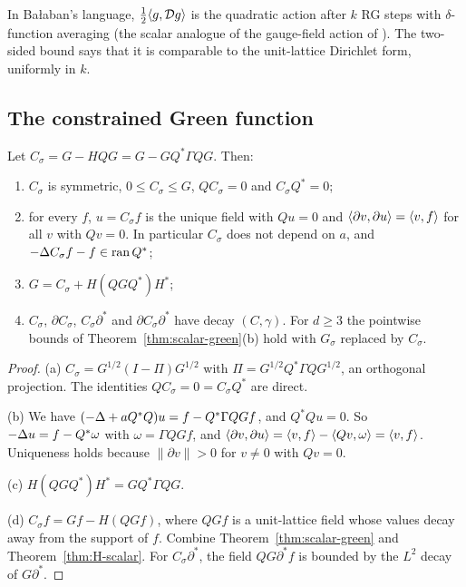 In Ba\l aban's language, $\frac12\langle g,\mathcal D g\rangle$ is the quadratic action after $k$ RG steps with $\delta$-function averaging (the scalar analogue of the gauge-field action of \cite[(1.65)--(1.67)]{BalPropI}). The two-sided bound says that it is comparable to the unit-lattice Dirichlet form, uniformly in $k$.

\subsection{The constrained Green function}

\begin{proposition}\label{prop:C-scalar}
Let $C_\sigma=G-HQG=G-GQ^*\Gamma QG$. Then:
\begin{enumerate}[label=(\alph*)]
\item $C_\sigma$ is symmetric, $0\le C_\sigma\le G$, $QC_\sigma=0$ and $C_\sigma Q^*=0$;
\item for every $f$, $u=C_\sigma f$ is the unique field with $Qu=0$ and $\langle \partial v,\partial u\rangle=\langle v,f\rangle$ for all $v$ with $Qv=0$. In particular $C_\sigma$ does not depend on $a$, and $-\Delta C_\sigma f-f\in\operatorname{ran} Q^*$;
\item $G=C_\sigma+H(QGQ^*)H^*$;
\item $C_\sigma$, $\partial C_\sigma$, $C_\sigma\partial^*$ and $\partial C_\sigma\partial^*$ have decay $(C,\gamma)$. For $d\ge3$ the pointwise bounds of Theorem~\ref{thm:scalar-green}(b) hold with $G_\sigma$ replaced by $C_\sigma$.
\end{enumerate}
\end{proposition}

\begin{proof}
(a) $C_\sigma=G^{1/2}(I-\Pi)G^{1/2}$ with $\Pi=G^{1/2}Q^*\Gamma QG^{1/2}$, an orthogonal projection. The identities $QC_\sigma=0=C_\sigma Q^*$ are direct.

(b) We have $(-\Delta+aQ^*Q)u=f-Q^*\Gamma QGf$, and $Q^*Qu=0$. So $-\Delta u=f-Q^*\omega$ with $\omega=\Gamma QGf$, and $\langle \partial v,\partial u\rangle=\langle v,f\rangle-\langle Qv,\omega\rangle=\langle v,f\rangle$. Uniqueness holds because $\|\partial v\|>0$ for $v\ne0$ with $Qv=0$.

(c) $H(QGQ^*)H^*=GQ^*\Gamma QG$.

(d) $C_\sigma f=Gf-H(QGf)$, where $QGf$ is a unit-lattice field whose values decay away from the support of $f$. Combine Theorem~\ref{thm:scalar-green} and Theorem~\ref{thm:H-scalar}. For $C_\sigma\partial^*$, the field $QG\partial^*f$ is bounded by the $L^2$ decay of $G\partial^*$.
\end{proof}

